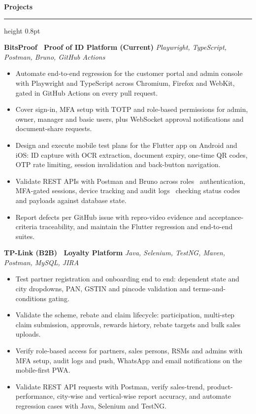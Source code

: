 \documentclass[10pt,a4paper]{article}
\newcommand{\sectionheader}[1]{%
    \vspace{4pt}
    {\normalsize\bfseries #1}
    \vspace{1pt}
    \hrule height 0.8pt
    \vspace{3pt}
}
\begin{document}

\sectionheader{Projects}

\textbf{BitsProof \textendash\ Proof of ID Platform (Current)} \hfill \textit{Playwright, TypeScript, Postman, Bruno, GitHub Actions}

\begin{itemize}
    \item Automate end-to-end regression for the customer portal and admin console with Playwright and TypeScript across Chromium, Firefox and WebKit, gated in GitHub Actions on every pull request.
    \item Cover sign-in, MFA setup with TOTP and role-based permissions for admin, owner, manager and basic users, plus WebSocket approval notifications and document-share requests.
    \item Design and execute mobile test plans for the Flutter app on Android and iOS: ID capture with OCR extraction, document expiry, one-time QR codes, OTP rate limiting, session invalidation and back-button navigation.
    \item Validate REST APIs with Postman and Bruno across roles \textendash\ authentication, MFA-gated sessions, device tracking and audit logs \textendash\ checking status codes and payloads against database state.
    \item Report defects per GitHub issue with repro-video evidence and acceptance-criteria traceability, and maintain the Flutter regression and end-to-end suites.
\end{itemize}

\textbf{TP-Link (B2B) \textendash\ Loyalty Platform} \hfill \textit{Java, Selenium, TestNG, Maven, Postman, MySQL, JIRA}

\begin{itemize}
    \item Test partner registration and onboarding end to end: dependent state and city dropdowns, PAN, GSTIN and pincode validation and terms-and-conditions gating.
    \item Validate the scheme, rebate and claim lifecycle: participation, multi-step claim submission, approvals, rewards history, rebate targets and bulk sales uploads.
    \item Verify role-based access for partners, sales persons, RSMs and admins with MFA setup, audit logs and push, WhatsApp and email notifications on the mobile-first PWA.
    \item Validate REST API requests with Postman, verify sales-trend, product-performance, city-wise and vertical-wise report accuracy, and automate regression cases with Java, Selenium and TestNG.
\end{itemize}
\end{document}
